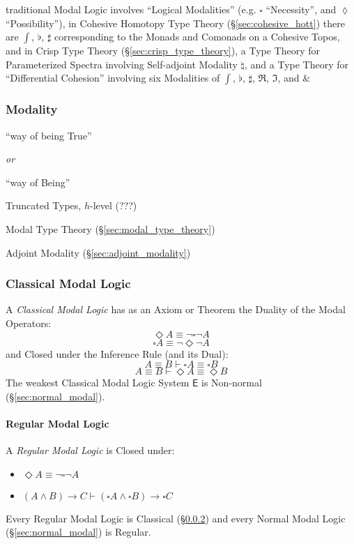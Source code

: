 traditional Modal Logic involves ``Logical Modalities'' (e.g. $\square$
``Necessity'', and $\lozenge$ ``Possibility''), in Cohesive Homotopy Type
Theory (\S\ref{sec:cohesive_hott}) there are $\int$, $\flat$, $\sharp$
corresponding to the Monads and Comonads on a Cohesive Topos,
and in Crisp Type Theory (\S\ref{sec:crisp_type_theory}), a Type Theory for
Parameterized Spectra involving Self-adjoint Modality $\natural$, and a Type
Theory for ``Differential Cohesion'' involving six Modalities of $\int$,
$\flat$, $\sharp$, $\mathfrak{R}$, $\mathfrak{I}$, and $\&$



\subsubsection{Modality}\label{sec:modality}

``way of being True''

\emph{or}

``way of Being''

Truncated Types, $h$-level (???) %

Modal Type Theory (\S\ref{sec:modal_type_theory})

Adjoint Modality (\S\ref{sec:adjoint_modality})



\subsubsection{Classical Modal Logic}\label{sec:classical_modal}

A \emph{Classical Modal Logic} has as an Axiom or Theorem the Duality
of the Modal Operators:
\[
  \Diamond A \equiv \neg \square \neg A
\]\[
  \square A \equiv \neg \Diamond \neg A
\]
and Closed under the Inference Rule (and its Dual):
\[
  A \equiv B \vdash \square A \equiv \square B
\]\[
  A \equiv B \vdash \Diamond A \equiv \Diamond B
\]
The weakest Classical Modal Logic System $\mathsf{E}$ is Non-normal
(\S\ref{sec:normal_modal}).



\paragraph{Regular Modal Logic}\label{sec:regular_modal}\hfill

A \emph{Regular Modal Logic} is Closed under:
\begin {itemize}

\item $\Diamond A \equiv \neg \square \neg A$

\item $(A \wedge B) \rightarrow C \vdash
  (\square A \wedge \square B) \rightarrow \square C$

\end {itemize}
Every Regular Modal Logic is Classical (\S\ref{sec:classical_modal})
and every Normal Modal Logic (\S\ref{sec:normal_modal}) is Regular.



